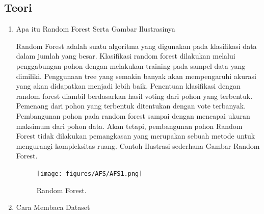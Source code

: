 \subsection{Teori}
\begin{enumerate}
\item Apa itu Random Forest Serta Gambar Ilustrasinya \par
Random Forest adalah suatu algoritma yang digunakan pada klasifikasi data dalam jumlah yang besar. Klasifikasi random forest dilakukan melalui penggabungan pohon  dengan melakukan training pada sampel data yang dimiliki. Penggunaan tree yang semakin banyak akan mempengaruhi akurasi yang akan didapatkan menjadi lebih baik. Penentuan klasifikasi dengan random forest diambil berdasarkan hasil voting dari pohon yang terbentuk. Pemenang dari pohon yang terbentuk ditentukan dengan vote terbanyak. Pembangunan pohon  pada random forest sampai dengan mencapai ukuran maksimum dari pohon data. Akan tetapi, pembangunan pohon Random Forest tidak dilakukan pemangkasan  yang merupakan sebuah metode untuk mengurangi kompleksitas ruang. Contoh Ilustrasi sederhana Gambar Random Forest. 
		\begin{figure}[ht]
		\centerline{\texttt{[image: figures/AFS/AFS1.png]}}
		\caption{Random Forest.}
		\label{AFS1}
		\end{figure}

\item Cara Membaca Dataset
	


\end{enumerate}
